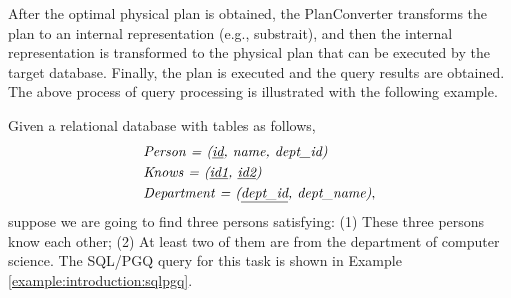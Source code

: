 After the optimal physical plan is obtained, the PlanConverter transforms the plan to an internal representation (e.g., substrait), and then the internal representation is transformed to the physical plan that can be executed by the target database.
Finally, the plan is executed and the query results are obtained.
The above process of query processing is illustrated with the following example.

\begin{example}
    Given a relational database with tables as follows,
    \begin{equation*}
        \begin{split}
            & \textit{Person = (\underline{id}, name, dept\_id)} \\
            & \textit{Knows = (\underline{id1}, \underline{id2})} \\
            & \textit{Department = (\underline{dept\_id}, dept\_name)}, \\
        \end{split}
    \end{equation*}
    suppose we are going to find three persons satisfying: 
    (1) These three persons know each other;
    (2) At least two of them are from the department of computer science.
    The SQL/PGQ query for this task is shown in Example \ref{example:introduction:sqlpgq}.      


\end{example}
